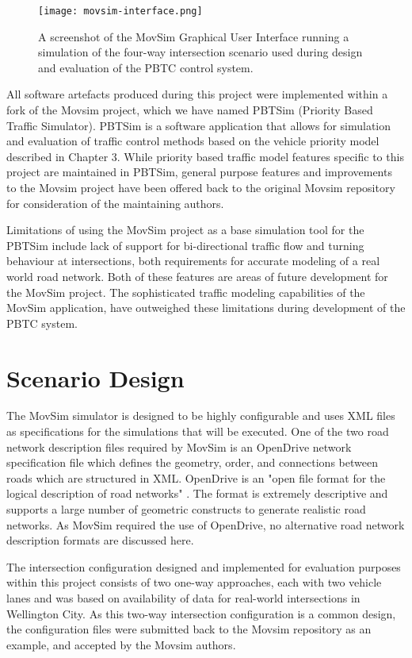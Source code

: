\begin{figure}[]
\centering
	\texttt{[image: movsim-interface.png]}
	\caption{ A screenshot of the MovSim Graphical User Interface running a simulation of the four-way intersection scenario used during design and evaluation of the PBTC control system. }
\label{intersectiondiagram}
\end{figure}

All software artefacts produced during this project were implemented within a fork of the Movsim project, which we have named PBTSim (Priority Based Traffic Simulator). PBTSim is a software application that allows for simulation and evaluation of traffic control methods based on the vehicle priority model described in Chapter 3. While priority based traffic model features specific to this project are maintained in PBTSim, general purpose features and improvements to the Movsim project have been offered back to the original Movsim repository for consideration of the maintaining authors.

Limitations of using the MovSim project as a base simulation tool for the PBTSim include lack of support for bi-directional traffic flow and turning behaviour at intersections, both requirements for accurate modeling of a real world road network. Both of these features are areas of future development for the MovSim project. The sophisticated traffic modeling capabilities of the MovSim application, have outweighed these limitations during development of the PBTC system.

\section{Scenario Design}

The MovSim simulator is designed to be highly configurable and uses XML files as specifications for the simulations that will be executed. One of the two road network description files required by MovSim is an OpenDrive network specification file which defines the geometry, order, and connections between roads which are structured in XML. OpenDrive is an "open file format for the logical description of road networks" \cite{opendrive}. The format is extremely descriptive and supports a large number of geometric constructs to generate realistic road networks. As MovSim required the use of OpenDrive, no alternative road network description formats are discussed here.

The intersection configuration designed and implemented for evaluation purposes within this project consists of two one-way approaches, each with two vehicle lanes and was based on availability of data for real-world intersections in Wellington City. As this two-way intersection configuration is a common design, the configuration files were submitted back to the Movsim repository as an example, and accepted by the Movsim authors. 


